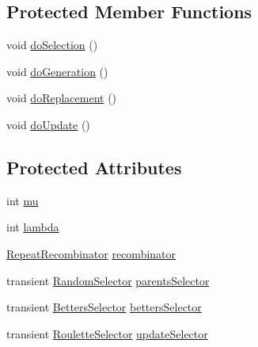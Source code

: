 \subsection*{Protected Member Functions}
\begin{DoxyCompactItemize}
\item 
void \hyperlink{classnet_1_1sf_1_1jclec_1_1algorithm_1_1gengap_1_1_m_g_g_af057b189ad3031d1759142519c1a6c50}{do\-Selection} ()
\item 
void \hyperlink{classnet_1_1sf_1_1jclec_1_1algorithm_1_1gengap_1_1_m_g_g_a2a4bc0290615d0d72666445c3d70a0ee}{do\-Generation} ()
\item 
void \hyperlink{classnet_1_1sf_1_1jclec_1_1algorithm_1_1gengap_1_1_m_g_g_a444d5350e176b3210f3e1c55f2ecad84}{do\-Replacement} ()
\item 
void \hyperlink{classnet_1_1sf_1_1jclec_1_1algorithm_1_1gengap_1_1_m_g_g_a457bcafbfa000d2bee5efaf78377b1c4}{do\-Update} ()
\end{DoxyCompactItemize}
\subsection*{Protected Attributes}
\begin{DoxyCompactItemize}
\item 
int \hyperlink{classnet_1_1sf_1_1jclec_1_1algorithm_1_1gengap_1_1_m_g_g_a54d54ef80c76a0f17b073e6ccfa4dc59}{mu}
\item 
int \hyperlink{classnet_1_1sf_1_1jclec_1_1algorithm_1_1gengap_1_1_m_g_g_a9ff16764aaa1eac1638b346e5e847725}{lambda}
\item 
\hyperlink{classnet_1_1sf_1_1jclec_1_1base_1_1_repeat_recombinator}{Repeat\-Recombinator} \hyperlink{classnet_1_1sf_1_1jclec_1_1algorithm_1_1gengap_1_1_m_g_g_a9766f8cca6d32372c8570b7d3c5e6a8c}{recombinator}
\item 
transient \hyperlink{classnet_1_1sf_1_1jclec_1_1selector_1_1_random_selector}{Random\-Selector} \hyperlink{classnet_1_1sf_1_1jclec_1_1algorithm_1_1gengap_1_1_m_g_g_a14ce69fe9d90868e0efb697097ec0bb4}{parents\-Selector}
\item 
transient \hyperlink{classnet_1_1sf_1_1jclec_1_1selector_1_1_betters_selector}{Betters\-Selector} \hyperlink{classnet_1_1sf_1_1jclec_1_1algorithm_1_1gengap_1_1_m_g_g_ae74beac9d672b12e1c867a7f0e98d43b}{betters\-Selector}
\item 
transient \hyperlink{classnet_1_1sf_1_1jclec_1_1selector_1_1_roulette_selector}{Roulette\-Selector} \hyperlink{classnet_1_1sf_1_1jclec_1_1algorithm_1_1gengap_1_1_m_g_g_afeff57b9f43dd10f6fe97420fa55a1a2}{update\-Selector}
\end{DoxyCompactItemize}


